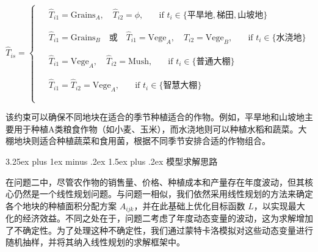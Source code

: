 \documentclass[12pt,a4paper]{nmmcm}
\makeatletter
\renewcommand\subsection{\@startsection{subsection}{2}{0pt}%
    {3.25ex plus 1ex minus .2ex}%
    {1.5ex plus .2ex}%
    {\normalfont\Large\bfseries}}
\makeatother
\begin{document}
\[
  \hat{T}_{is} =
  \begin{cases}
    \begin{aligned}
       & \hat{T}_{i1} = \text{Grains}_A, \quad \hat{T}_{i2} = \phi, \quad & \text{if } t_i \in \{\text{平旱地}, \text{梯田}, \text{山坡地}\} \\
    \end{aligned}                                     \\
    \begin{aligned}
       & \hat{T}_{i1} = \text{Grains}_B \quad \text{或} \quad \hat{T}_{i1} = \text{Vege}_A, \quad \hat{T}_{i2} = \text{Vege}_B, \quad & \text{if } t_i \in \{\text{水浇地}\} \\
    \end{aligned} \\
    \begin{aligned}
       & \hat{T}_{i1} = \text{Vege}_A, \quad \hat{T}_{i2} = \text{Mush}, \quad & \text{if } t_i \in \{\text{普通大棚}\} \\
    \end{aligned}                                                      \\
    \begin{aligned}
       & \hat{T}_{i1} = \hat{T}_{i2} = \text{Vege}_A, \quad & \text{if } t_i \in \{\text{智慧大棚}\} \\
    \end{aligned}                                                                         \\
  \end{cases}
\]

该约束可以确保不同地块在适合的季节种植适合的作物。例如，平旱地和山坡地主要用于种植A类粮食作物（如小麦、玉米），而水浇地则可以种植水稻和蔬菜。大棚地块则适合种植蔬菜和食用菌，根据不同季节安排合适的作物组合。


\subsection{模型求解思路}

在问题二中，尽管农作物的销售量、价格、种植成本和产量存在年度波动，但其核心仍然是一个线性规划问题。与问题一相似，我们依然采用线性规划的方法来确定各个地块的种植面积分配方案 $A_{ijk}$，并在此基础上优化目标函数 $L$，以实现最大化的经济效益。不同之处在于，问题二考虑了年度动态变量的波动，这为求解增加了不确定性。为了处理这种不确定性，我们通过蒙特卡洛模拟对这些动态变量进行随机抽样，并将其纳入线性规划的求解框架中。
\end{document}
